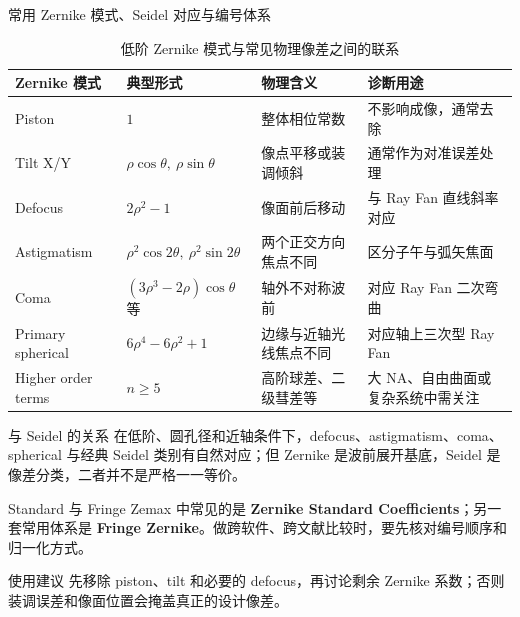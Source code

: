 \begin{frame}{常用 Zernike 模式、Seidel 对应与编号体系}
\label{1.9}
    \tiny
    \begin{table}
        \centering
        \renewcommand{\arraystretch}{1.22}
        \begin{tabular}{p{2.0cm}|p{2.8cm}|p{2.6cm}|p{3.2cm}}
            \toprule
            \textbf{Zernike 模式} & \textbf{典型形式} & \textbf{物理含义} & \textbf{诊断用途} \\
            \midrule
            Piston & $1$ & 整体相位常数 & 不影响成像，通常去除 \\
            Tilt X/Y & $\rho\cos\theta,\ \rho\sin\theta$ & 像点平移或装调倾斜 & 通常作为对准误差处理 \\
            Defocus & $2\rho^2-1$ & 像面前后移动 & 与 Ray Fan 直线斜率对应 \\
            Astigmatism & $\rho^2\cos2\theta,\ \rho^2\sin2\theta$ & 两个正交方向焦点不同 & 区分子午与弧矢焦面 \\
            Coma & $(3\rho^3-2\rho)\cos\theta$ 等 & 轴外不对称波前 & 对应 Ray Fan 二次弯曲 \\
            Primary spherical & $6\rho^4-6\rho^2+1$ & 边缘与近轴光线焦点不同 & 对应轴上三次型 Ray Fan \\
            Higher order terms & $n\ge5$ & 高阶球差、二级彗差等 & 大 NA、自由曲面或复杂系统中需关注 \\
            \bottomrule
        \end{tabular}
        \caption{低阶 Zernike 模式与常见物理像差之间的联系}
        \label{tab:zernike_modes_main}
    \end{table}

    \vspace{-4pt}
    \begin{block}{与 Seidel 的关系}
        在低阶、圆孔径和近轴条件下，defocus、astigmatism、coma、spherical 与经典 Seidel 类别有自然对应；但 Zernike 是\alert{波前展开基底}，Seidel 是\alert{像差分类}，二者并不是严格一一等价。
    \end{block}

    \vspace{-4pt}
    \begin{alertblock}{Standard 与 Fringe}
        Zemax 中常见的是 \textbf{Zernike Standard Coefficients}；另一套常用体系是 \textbf{Fringe Zernike}。做跨软件、跨文献比较时，要先核对编号顺序和归一化方式。
    \end{alertblock}

    \vspace{-4pt}
    \begin{block}{使用建议}
        先移除 piston、tilt 和必要的 defocus，再讨论剩余 Zernike 系数；否则装调误差和像面位置会掩盖真正的设计像差。
    \end{block}
\end{frame}

